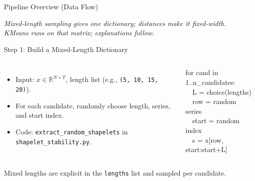 \documentclass[aspectratio=169]{beamer}
\begin{document}
\begin{frame}{Pipeline Overview (Data Flow)}
\begin{center}
\end{center}
\vspace{4pt}
{\scriptsize\itshape Mixed-length sampling gives one dictionary; distances make it fixed-width.\\
KMeans runs on that matrix; explanations follow.}
\end{frame}

\begin{frame}{Step 1: Build a Mixed-Length Dictionary}
\begin{columns}[T,onlytextwidth]
  \begin{itemize}\footnotesize\setlength\itemsep{4pt}
    \item Input: $x \in \mathbb{R}^{N \times T}$, length list (e.g., \texttt{(5, 10, 15, 20)}).
    \item For each candidate, randomly choose length, series, and start index.
    \item Code: \texttt{extract\_random\_shapelets} in \texttt{shapelet\_stability.py}.
  \end{itemize}
  \begin{tcolorbox}[enhanced,boxrule=1pt,arc=2pt,colback=clight,colframe=cmid]
    \ttfamily\footnotesize
    for cand in 1..n\_candidates:\\
    \ \ L = choice(lengths)\\
    \ \ row = random series\\
    \ \ start = random index\\
    \ \ s = x[row, start:start+L]
  \end{tcolorbox}
\end{columns}
\vspace{4pt}
{\scriptsize\color{cmuted}Mixed lengths are explicit in the \texttt{lengths} list and sampled per candidate.}
\end{frame}
\end{document}
